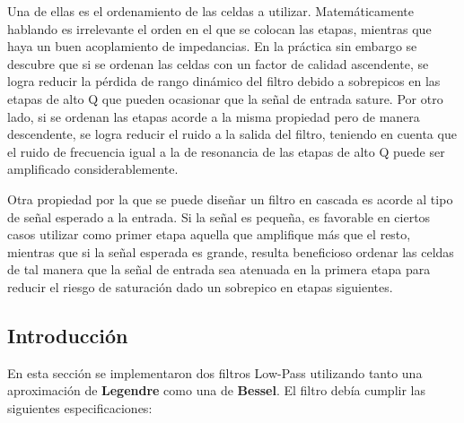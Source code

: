 Una de ellas es el ordenamiento de las celdas a utilizar. Matemáticamente hablando es irrelevante el orden en el que se colocan las etapas, mientras que haya un buen acoplamiento de impedancias. En la práctica sin embargo se descubre que si se ordenan las celdas con un factor de calidad ascendente, se logra reducir la pérdida de rango dinámico del filtro debido a sobrepicos en las etapas de alto Q que pueden ocasionar que la señal de entrada sature. Por otro lado, si se ordenan las etapas acorde a la misma propiedad pero de manera descendente, se logra reducir el ruido a la salida del filtro, teniendo en cuenta que el ruido de frecuencia igual a la de resonancia de las etapas de alto Q puede ser amplificado considerablemente.

Otra propiedad por la que se puede diseñar un filtro en cascada es acorde al tipo de señal esperado a la entrada. Si la señal es pequeña, es favorable en ciertos casos utilizar como primer etapa aquella que amplifique más que el resto, mientras que si la señal esperada es grande, resulta beneficioso ordenar las celdas de tal manera que la señal de entrada sea atenuada en la primera etapa para reducir el riesgo de saturación dado un sobrepico en etapas siguientes.

\subsection{Introducción}

En esta sección se implementaron dos filtros Low-Pass utilizando tanto una aproximación de \textbf{Legendre} como una de \textbf{Bessel}. El filtro debía cumplir las siguientes especificaciones:

